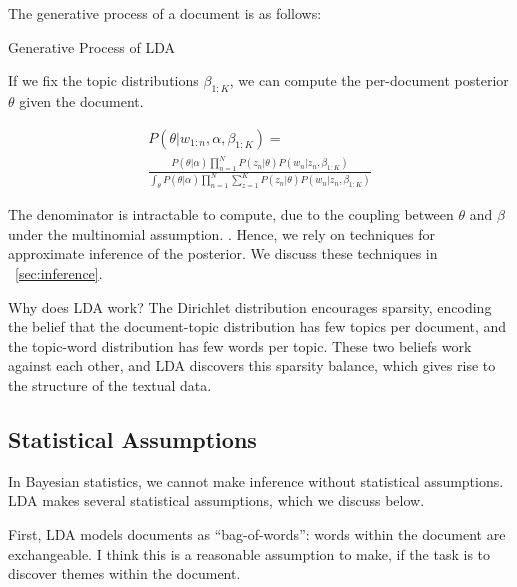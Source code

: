 \documentclass[letterpaper]{article}
\begin{document}
The generative process of a document is as follows:

\begin{algorithm}
  \caption{Generative Process of LDA}\label{alg:LDA}
  \begin{algorithmic}[1]
    \EndFor
    \EndFor
  \end{algorithmic}
\end{algorithm}

If we fix the topic distributions $\beta_{1:K}$, we can compute the
per-document posterior $\theta$ given the document.

\begin{multline}
  P(\theta | w_{1:n}, \alpha, \beta_{1:K}) = \\ \frac{P(\theta |
    \alpha)\prod_{n=1}^{N} P(z_n | \theta) P(w_n | z_n,
    \beta_{1:K})}{\int_\theta P(\theta | \alpha) \prod_{n=1}^N
    \sum_{z=1}^K P(z_n | \theta) P(w_n | z_n, \beta_{1:K})}
\end{multline}


The denominator is intractable to compute, due to the coupling
between $\theta$ and $\beta$ under the multinomial assumption.
\cite{blei2003latent}. Hence, we rely on techniques for approximate
inference of the posterior. We discuss these techniques in
~\autoref{sec:inference}.

Why does LDA work? The Dirichlet distribution encourages sparsity,
encoding the belief that the document-topic distribution has few
topics per document, and the topic-word distribution has few words per
topic. These two beliefs work against each other, and LDA discovers
this sparsity balance, which gives rise to the structure of the
textual data.

\subsection{Statistical Assumptions}
\label{subsec:statistical-assumptions}
In Bayesian statistics, we cannot make inference without statistical
assumptions. LDA makes several statistical assumptions, which we
discuss below.

First, LDA models documents as ``bag-of-words'': words within the
document are exchangeable. \cite{blei2003latent} I think this is a
reasonable assumption to make, if the task is to discover themes
within the document.
\end{document}

